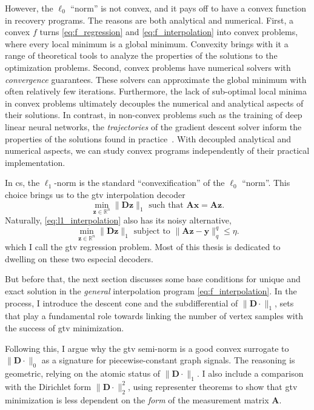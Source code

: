 However, the $\ell_0$ ``norm'' is not convex, and it pays off to have a convex function in recovery programs. The reasons are both analytical and numerical. First, a convex $f$ turns \eqref{eq:f_regression} and \eqref{eq:f_interpolation} into convex problems, where every local minimum is a global minimum. Convexity brings with it a range of theoretical tools to analyze the properties of the solutions to the optimization problems. Second, convex problems have numerical solvers with \emph{convergence} guarantees. These solvers can approximate the global minimum with often relatively few iterations. Furthermore, the lack of sub-optimal local minima in convex problems ultimately decouples the numerical and analytical aspects of their solutions. In contrast, in non-convex problems such as the training of deep linear neural networks, the \emph{trajectories} of the gradient descent solver inform the properties of the solutions found in practice~\cite{arora2018a}. With decoupled analytical and numerical aspects, we can study convex programs independently of their practical implementation.

In \acrlong{cs}, the $\ell_1$-norm is the standard ``convexification'' of the $\ell_0$ ``norm''. This choice brings us to the \acrfull{gtv} interpolation decoder
\begin{equation}
    \underset{\mathbf{z} \in \mathbb{R}^{n}}{\min} \| \mathbf{D z} \|_1 \text{ such that } \mathbf{Ax = Az} \tag{P1} \label{eq:l1_interpolation}.
\end{equation}
Naturally, \eqref{eq:l1_interpolation} also has its noisy alternative,
\begin{equation}
    \underset{\mathbf{z} \in \mathbb{R}^{n}}{\min}  \| \mathbf{D z} \|_1 \text{ subject to } \| \mathbf{Az - y} \|_q^q \leq \eta \tag{P1-$\eta$} \label{eq:l1_regression}.
\end{equation}
which I call the \acrshort{gtv} regression problem. Most of this thesis is dedicated to dwelling on these two especial decoders.

But before that, the next section discusses some base conditions for unique and exact solution in the \emph{general} interpolation program \eqref{eq:f_interpolation}. In the process, I introduce the descent cone and the subdifferential of $\|\mathbf{D} \cdot\|_1$, sets that play a fundamental role towards linking the number of vertex samples with the success of \acrshort{gtv} minimization.

Following this, I argue why the \acrshort{gtv} semi-norm is a good convex surrogate to $\|\mathbf{D} \cdot\|_0$ as a signature for piecewise-constant graph signals. The reasoning is geometric, relying on the atomic status of $\|\mathbf{D} \cdot\|_1$. I also include a comparison with the Dirichlet form $\|\mathbf{D} \cdot\|_2^2$, using representer theorems to show that \acrshort{gtv} minimization is less dependent on the \emph{form} of the measurement matrix $\mathbf{A}$.

